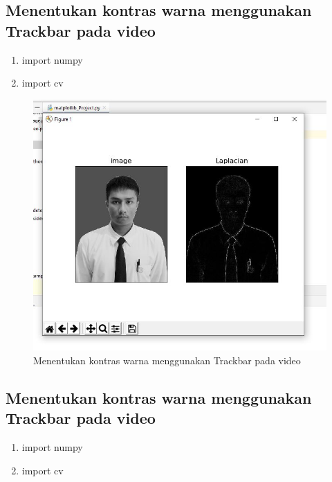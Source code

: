 \newpage
\subsection{Menentukan kontras warna menggunakan Trackbar pada video}

\begin{enumerate}
	\item import numpy
	\item import cv
\end{enumerate}

\newpage
\begin{figure}[ht]
\centering
\includegraphics[scale=0.5]{figures/2,64.jpg}
\caption{Menentukan kontras warna menggunakan Trackbar pada video}
\label{contoh}
\end{figure}





\newpage
\subsection{Menentukan kontras warna menggunakan Trackbar pada video}

\begin{enumerate}
	\item import numpy
	\item import cv
\end{enumerate}

